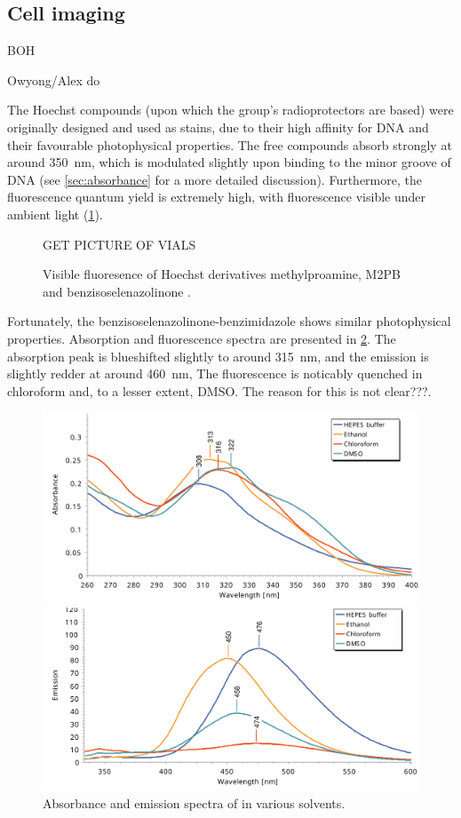 \begin{refsection}
\section{Cell imaging}

BOH

Owyong/Alex do

The Hoechst compounds (upon which the group's radioprotectors are based) were originally designed and used as stains, due to their high affinity for DNA and their favourable photophysical properties.\autocite{???}
The free compounds absorb strongly at around 350~nm, which is modulated slightly upon binding to the minor groove of DNA (see \cref{sec:absorbance} for a more detailed discussion).
Furthermore, the fluorescence quantum yield is extremely high, with fluorescence visible under ambient light (\cref{fig:hoechst-fluorescence}).

\begin{figure}
    \centering
    GET PICTURE OF VIALS
    \caption{Visible fluoresence of Hoechst derivatives methylproamine, M2PB  and benzisoselenazolinone .}
    \label{fig:hoechst-fluorescence}
\end{figure}

Fortunately, the benzisoselenazolinone-benzimidazole  shows similar photophysical properties.
Absorption and fluorescence spectra are presented in \cref{fig:ebs-rhs-spectra}.
The absorption peak is blueshifted slightly to around 315~nm, and the emission is slightly redder at around 460~nm,
The fluorescence is noticably quenched in chloroform and, to a lesser extent, DMSO.
The reason for this is not clear???.

\begin{figure} 
    \centering
    \includegraphics[width=0.8\linewidth]{Figures/ebs-rhs-abs.pdf}

    \includegraphics[width=0.8\linewidth]{Figures/ebs-rhs-fl.pdf}
    \caption{Absorbance and emission spectra of  in various solvents.}
    \label{fig:ebs-rhs-spectra}
\end{figure}


\end{refsection}
